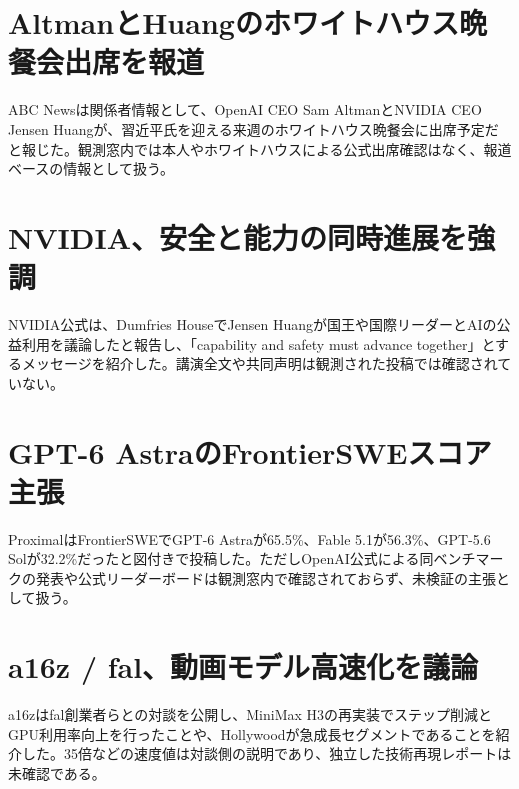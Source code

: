 \section{AltmanとHuangのホワイトハウス晩餐会出席を報道}
ABC Newsは関係者情報として、OpenAI CEO Sam AltmanとNVIDIA CEO Jensen Huangが、習近平氏を迎える来週のホワイトハウス晩餐会に出席予定だと報じた。観測窓内では本人やホワイトハウスによる公式出席確認はなく、報道ベースの情報として扱う。

\section{NVIDIA、安全と能力の同時進展を強調}
NVIDIA公式は、Dumfries HouseでJensen Huangが国王や国際リーダーとAIの公益利用を議論したと報告し、「capability and safety must advance together」とするメッセージを紹介した。講演全文や共同声明は観測された投稿では確認されていない。

\section{GPT-6 AstraのFrontierSWEスコア主張}
ProximalはFrontierSWEでGPT-6 Astraが65.5\%、Fable 5.1が56.3\%、GPT-5.6 Solが32.2\%だったと図付きで投稿した。ただしOpenAI公式による同ベンチマークの発表や公式リーダーボードは観測窓内で確認されておらず、未検証の主張として扱う。

\section{a16z / fal、動画モデル高速化を議論}
a16zはfal創業者らとの対談を公開し、MiniMax H3の再実装でステップ削減とGPU利用率向上を行ったことや、Hollywoodが急成長セグメントであることを紹介した。35倍などの速度値は対談側の説明であり、独立した技術再現レポートは未確認である。
